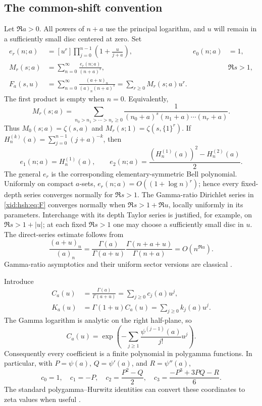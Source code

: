 \documentclass[11pt,a4paper]{article}
\numberwithin{equation}{section}
\theoremstyle{definition}
\theoremstyle{remark}
\begin{document}
\subsection{The common-shift convention}

Let $\Re a>0$. All powers of $n+a$ use the principal logarithm, and $u$
will remain in a sufficiently small disc centered at zero. Set
\begin{align}
 e_r(n;a)&=[u^r]\prod_{j=0}^{n-1}\left(1+\frac{u}{j+a}\right),
       &e_0(n;a)&=1,\label{xid:hsh:eq:er}\\
 M_r(s;a)&=\sum_{n=0}^{\infty}\frac{e_r(n;a)}{(n+a)^s},
       &&\Re s>1,\label{xid:hsh:eq:Mr}\\
 F_a(s,u)&=\sum_{n=0}^{\infty}
       \frac{(a+u)_n}{(a)_n(n+a)^s}
       =\sum_{r\ge0}M_r(s;a)u^r.
       \label{xid:hsh:eq:F}
\end{align}
The first product is empty when $n=0$. Equivalently,
\[
 M_r(s;a)=\sum_{n_0>n_1>\cdots>n_r\ge0}
       \frac{1}{(n_0+a)^s(n_1+a)\cdots(n_r+a)}.
\]
Thus $M_0(s;a)=\zeta(s,a)$ and $M_r(s;1)=\zeta(s,\{1\}^r)$.
If $H_n^{(k)}(a)=\sum_{j=0}^{n-1}(j+a)^{-k}$, then
\[
 e_1(n;a)=H_n^{(1)}(a),\qquad
 e_2(n;a)=\frac{(H_n^{(1)}(a))^2-H_n^{(2)}(a)}2.
\]
The general $e_r$ is the corresponding elementary-symmetric Bell
polynomial. Uniformly on compact $a$-sets,
$e_r(n;a)=O((1+\log n)^r)$; hence every fixed-depth series converges
normally for $\Re s>1$. The Gamma-ratio Dirichlet series in \eqref{xid:hsh:eq:F} converges normally
when $\Re s>1+\Re u$, locally uniformly in its parameters. Interchange
with its depth Taylor series is justified, for example, on
$\Re s>1+|u|$; at each fixed $\Re s>1$ one may choose a sufficiently
small disc in $u$. The direct-series estimate follows from
\[
 \frac{(a+u)_n}{(a)_n}
 =\frac{\Gamma(a)}{\Gamma(a+u)}
    \frac{\Gamma(n+a+u)}{\Gamma(n+a)}
 =O(n^{\Re u}).
\]
Gamma-ratio asymptotics and their uniform sector versions are classical
\cite{hsh:DLMFGamma}.

Introduce
\begin{align}
 C_a(u)&=\frac{\Gamma(a)}{\Gamma(a+u)}
        =\sum_{j\ge0}c_j(a)u^j,\label{xid:hsh:eq:Ca}\\
 K_a(u)&=\Gamma(1+u)C_a(u)
        =\sum_{j\ge0}k_j(a)u^j.\label{xid:hsh:eq:Ka}
\end{align}
The Gamma logarithm is analytic on the right half-plane, so
\begin{equation}\label{xid:hsh:eq:Cexp}
 C_a(u)=\exp\left(-\sum_{j\ge1}
                \frac{\psi^{(j-1)}(a)}{j!}u^j\right).
\end{equation}
Consequently every coefficient is a finite polynomial in polygamma
functions. In particular, with $P=\psi(a)$, $Q=\psi'(a)$, and
$R=\psi''(a)$,
\[
 c_0=1,\quad c_1=-P,\quad c_2=\frac{P^2-Q}{2},\quad
 c_3=\frac{-P^3+3PQ-R}{6}.
\]
The standard polygamma--Hurwitz identities can convert these coordinates
to zeta values when useful \cite{hsh:DLMFPolygamma,DLMFhurwitz}.
\end{document}
